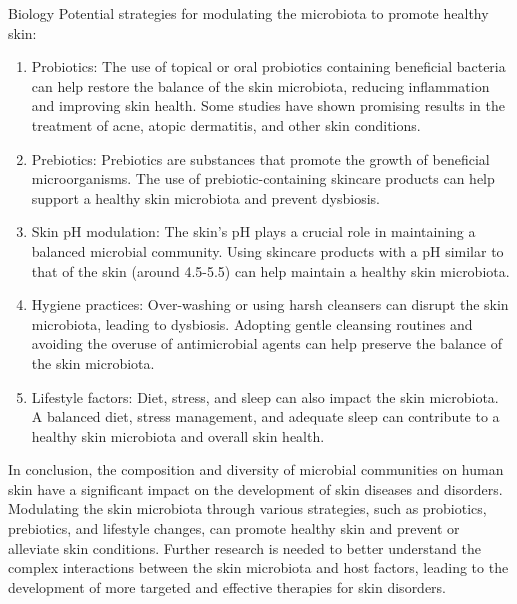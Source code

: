 \begin{AIBoxBreak}{Biology}
	Potential strategies for modulating the microbiota to promote healthy skin:

	\begin{enumerate}
		\item Probiotics: The use of topical or oral probiotics containing beneficial bacteria can help restore the balance of the skin microbiota, reducing inflammation and improving skin health. Some studies have shown promising results in the treatment of acne, atopic dermatitis, and other skin conditions.

		\item Prebiotics: Prebiotics are substances that promote the growth of beneficial microorganisms. The use of prebiotic-containing skincare products can help support a healthy skin microbiota and prevent dysbiosis.

		\item Skin pH modulation: The skin's pH plays a crucial role in maintaining a balanced microbial community. Using skincare products with a pH similar to that of the skin (around 4.5-5.5) can help maintain a healthy skin microbiota.

		\item Hygiene practices: Over-washing or using harsh cleansers can disrupt the skin microbiota, leading to dysbiosis. Adopting gentle cleansing routines and avoiding the overuse of antimicrobial agents can help preserve the balance of the skin microbiota.

		\item Lifestyle factors: Diet, stress, and sleep can also impact the skin microbiota. A balanced diet, stress management, and adequate sleep can contribute to a healthy skin microbiota and overall skin health.
	\end{enumerate}

	In conclusion, the composition and diversity of microbial communities on human skin have a significant impact on the development of skin diseases and disorders. Modulating the skin microbiota through various strategies, such as probiotics, prebiotics, and lifestyle changes, can promote healthy skin and prevent or alleviate skin conditions. Further research is needed to better understand the complex interactions between the skin microbiota and host factors, leading to the development of more targeted and effective therapies for skin disorders.


\end{AIBoxBreak}

\clearpage


